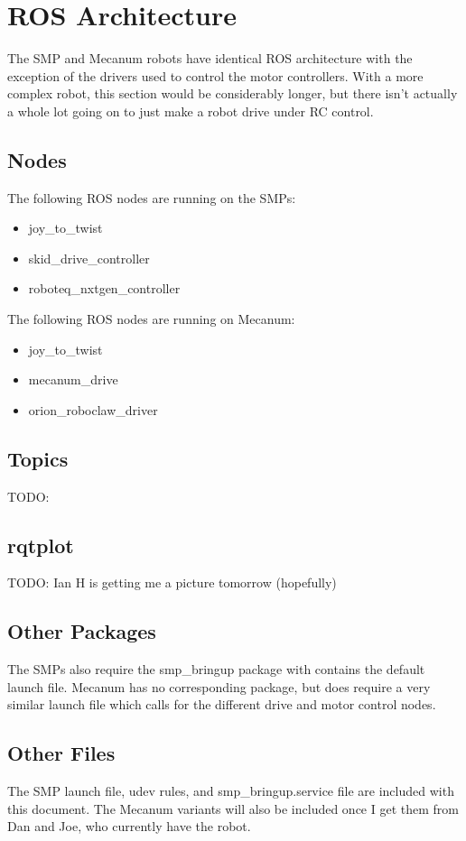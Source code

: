 
\chapter{ROS Architecture}
\label{chap:rosarch}

The SMP and Mecanum robots have identical ROS architecture with the exception of the drivers used to control the motor controllers. With a more complex robot, this section would be considerably longer, but there isn't actually a whole lot going on to just make a robot drive under RC control.

\section{Nodes}

The following ROS nodes are running on the SMPs:

\begin{itemize}
\item{joy\_to\_twist}
\item{skid\_drive\_controller}
\item{roboteq\_nxtgen\_controller}
\end{itemize}

The following ROS nodes are running on Mecanum:

\begin{itemize}
\item{joy\_to\_twist}
\item{mecanum\_drive}
\item{orion\_roboclaw\_driver}
\end{itemize}

\section{Topics}

TODO:

\section{rqtplot}

TODO: Ian H is getting me a picture tomorrow (hopefully)

\section{Other Packages}

The SMPs also require the smp\_bringup package with contains the default launch file. Mecanum has no corresponding package, but does require a very similar launch file which calls for the different drive and motor control nodes.

\section{Other Files}

The SMP launch file, udev rules, and smp\_bringup.service file are included with this document. The Mecanum variants will also be included once I get them from Dan and Joe, who currently have the robot.
